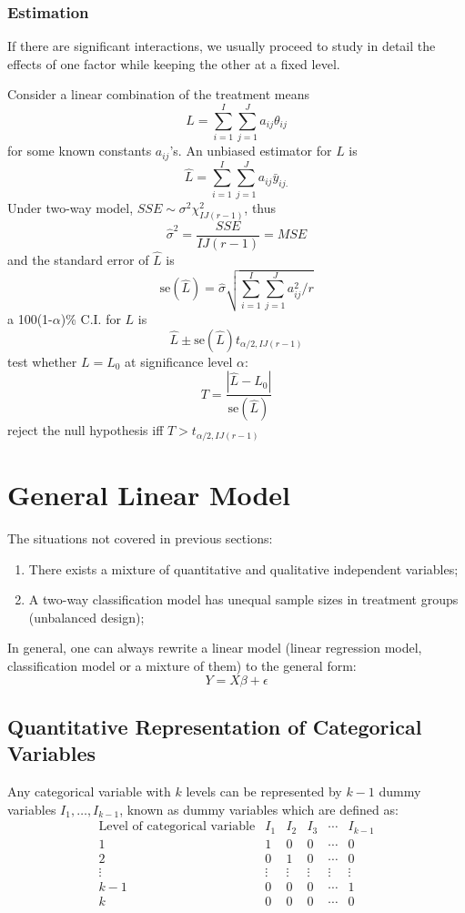 \documentclass[11pt,a4paper]{article}
\begin{document}
\subsubsection{Estimation}
If there are significant interactions, we usually proceed to study in detail the effects of one factor while keeping the other at a fixed level. \par
Consider a linear combination of the treatment means
\[
L = \sum_{i=1}^I \sum_{j=1}^J a_{ij} \theta_{ij}
\]
for some known constants $a_{ij}$'s. An unbiased estimator for $L$ is
\[
\hat{L} = \sum_{i=1}^I \sum_{j=1}^J a_{ij} \bar{y}_{ij.}
\]
Under two-way model, $SSE \sim \sigma^2 \chi^2_{IJ(r-1)}$, thus
\[
\hat{\sigma}^2 = \frac{SSE}{IJ(r-1)} = MSE  
\]
and the standard error of $\hat{L}$ is
\[
\text{se}(\hat{L}) = \hat{\sigma} \sqrt{\sum_{i=1}^I \sum_{j=1}^J a_{ij}^2 / r}
\]
a 100(1-$\alpha$)\% C.I. for $L$ is
\[
\hat{L} \pm \text{se}(\hat{L}) t_{\alpha/2, IJ(r-1)}
\]
test whether $L = L_0$ at significance level $\alpha$:
\[
T = \frac{\left|\hat{L} - L_0\right|}{\text{se}(\hat{L})}
\]
reject the null hypothesis iff $T > t_{\alpha/2, IJ(r-1)}$ \par

\section{General Linear Model}
The situations not covered in previous sections:
\begin{enumerate}
    \item There exists a mixture of quantitative and qualitative independent variables;
    \item A two-way classification model has unequal sample sizes in treatment groups (unbalanced design);
\end{enumerate}

In general, one can always rewrite a linear model (linear regression model, classification model or a mixture of them) to the general form:
\[
Y = X \beta + \epsilon
\]

\subsection{Quantitative Representation of Categorical Variables}
Any categorical variable with $k$ levels can be represented by $k-1$ dummy variables $I_1, \dots, I_{k-1}$, known as dummy variables which are defined as:
\[
\begin{array}{l|ccccc}
    \text{Level of categorical variable} & I_1 & I_2 & I_3 & \cdots & I_{k-1} \\
    \hline
    1 & 1 & 0 & 0 & \cdots & 0 \\
    2 & 0 & 1 & 0 & \cdots & 0 \\
    \vdots & \vdots & \vdots & \vdots & \vdots & \vdots \\
    k-1 & 0 & 0 & 0 & \cdots & 1 \\
    k & 0 & 0 & 0 & \cdots & 0 \\
\end{array}
\]
\end{document}
